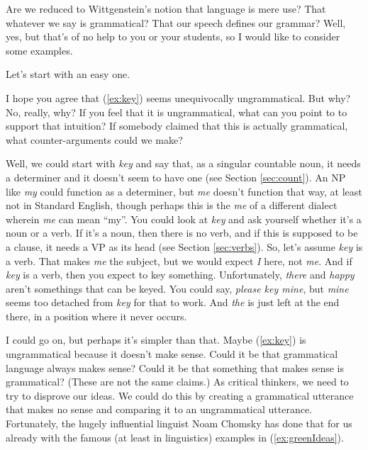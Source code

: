Are we reduced to Wittgenstein's notion that language is mere use? That whatever we say is grammatical? That our speech defines our grammar? Well, yes, but that's of no help to you or your students, so I would like to consider some examples.

Let's start with an easy one.


\label{ex:key}
\z


I hope you agree that (\ref{ex:key}) seems unequivocally ungrammatical. But why? No, really, why? If you feel that it is ungrammatical, what can you point to to support that intuition? If somebody claimed that this is actually grammatical, what counter-arguments could we make?

Well, we could start with \textit{key} and say that, as a singular countable noun, it needs a determiner and it doesn't seem to have one (see Section \ref{sec:count}). An NP like \textit{my} could function as a determiner, but \textit{me} doesn't function that way, at least not in Standard English, though perhaps this is the \textit{me} of a different dialect wherein \textit{me} can mean ``my''. You could look at \textit{key} and ask yourself whether it's a noun or a verb. If it's a noun, then there is no verb, and if this is supposed to be a clause, it needs a VP as its head (see Section \ref{sec:verbs}). So, let's assume \textit{key} is a verb. That makes \textit{me} the subject, but we would expect \textit{I} here, not \textit{me}. And if \textit{key} is a verb, then you expect to key something. Unfortunately, \textit{there} and \textit{happy} aren't somethings that can be keyed. You could say, \textit{please key mine}, but \textit{mine} seems too detached from \textit{key} for that to work. And \textit{the} is just left at the end there, in a position where it never occurs.

I could go on, but perhaps it's simpler than that. Maybe (\ref{ex:key}) is ungrammatical because it doesn't make sense. Could it be that grammatical language always makes sense? Could it be that something that makes sense is grammatical? (These are not the same claims.) As critical thinkers, we need to try to disprove our ideas. We could do this by creating a grammatical utterance that makes no sense and comparing it to an ungrammatical utterance. Fortunately, the hugely influential linguist Noam Chomsky has done that for us already with the famous (at least in linguistics) examples in (\ref{ex:greenIdeas}).

